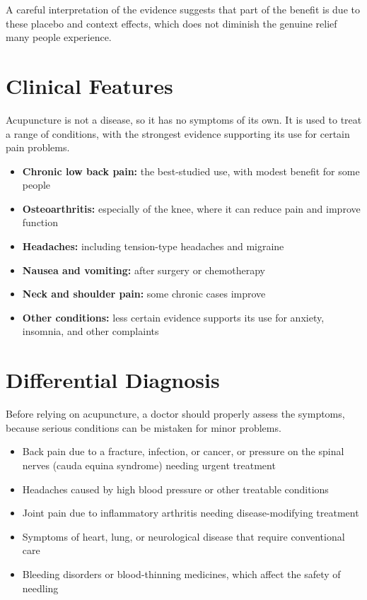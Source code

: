 A careful interpretation of the evidence suggests that part of the benefit is due to these placebo and context effects, which does not diminish the genuine relief many people experience.

\section*{Clinical Features}
Acupuncture is not a disease, so it has no symptoms of its own. It is used to treat a range of conditions, with the strongest evidence supporting its use for certain pain problems.

\begin{itemize}
    \item \textbf{Chronic low back pain:} the best-studied use, with modest benefit for some people
    \item \textbf{Osteoarthritis:} especially of the knee, where it can reduce pain and improve function
    \item \textbf{Headaches:} including tension-type headaches and migraine
    \item \textbf{Nausea and vomiting:} after surgery or chemotherapy
    \item \textbf{Neck and shoulder pain:} some chronic cases improve
    \item \textbf{Other conditions:} less certain evidence supports its use for anxiety, insomnia, and other complaints
\end{itemize}

\section*{Differential Diagnosis}
Before relying on acupuncture, a doctor should properly assess the symptoms, because serious conditions can be mistaken for minor problems.

\begin{itemize}
    \item Back pain due to a fracture, infection, or cancer, or pressure on the spinal nerves (cauda equina syndrome) needing urgent treatment
    \item Headaches caused by high blood pressure or other treatable conditions
    \item Joint pain due to inflammatory arthritis needing disease-modifying treatment
    \item Symptoms of heart, lung, or neurological disease that require conventional care
    \item Bleeding disorders or blood-thinning medicines, which affect the safety of needling
\end{itemize}

